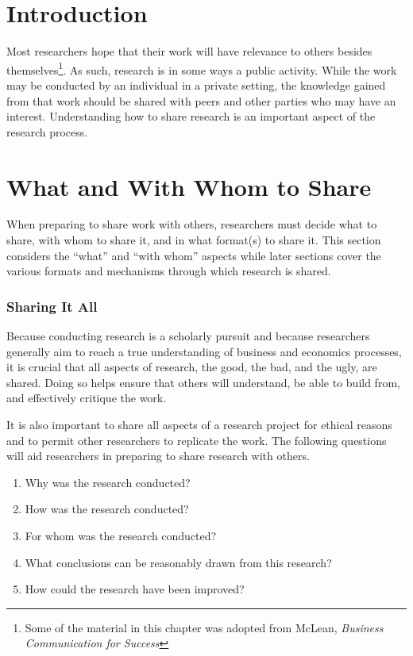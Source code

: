 \section{Introduction}

Most researchers hope that their work will have relevance to others besides themselves\footnote{Some of the material in this chapter was adopted from McLean, \textit{Business Communication for Success}\cite{mclean2012business}}. As such, research is in some ways a public activity. While the work may be conducted by an individual in a private setting, the knowledge gained from that work should be shared with  peers and other parties who may have an interest. Understanding how to share research is an important aspect of the research process.

\section{What and With Whom to Share}

When preparing to share work with others, researchers must decide what to share, with whom to share it, and in what format(s) to share it. This section considers the ``what'' and ``with whom'' aspects while later sections cover the various formats and mechanisms through which research is shared.

\subsubsection{Sharing It All}

Because conducting research is a scholarly pursuit and because researchers generally aim to reach a true understanding of business and economics processes, it is crucial that all aspects of research, the good, the bad, and the ugly, are shared. Doing so helps ensure that others will understand, be able to build from, and effectively critique the work.

It is also important to share all aspects of a research project for ethical reasons and to permit other researchers to replicate the work. The following questions will aid researchers in preparing to share research with others.

\begin{enumerate}
	\item Why was the research conducted?
	\item How was the research conducted?
	\item For whom was the research conducted?
	\item What conclusions can be reasonably drawn from this research?
	\item How could the research have been improved?
\end{enumerate}

